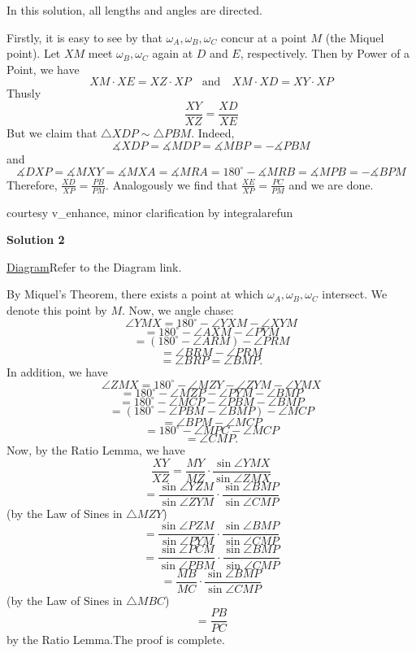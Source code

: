 \begin{enumerate}
 In this solution, all lengths and angles are directed.

 Firstly, it is easy to see by that $\omega_A, \omega_B, \omega_C$ concur at a point $M$ (the Miquel point). Let $XM$ meet $\omega_B, \omega_C$ again at $D$ and $E$, respectively. Then by Power of a Point, we have 
 \[XM \cdot XE = XZ \cdot XP \quad\text{and}\quad XM \cdot XD = XY \cdot XP\] Thusly 
 \[\frac{XY}{XZ} = \frac{XD}{XE}\] But we claim that $\triangle XDP \sim \triangle PBM$. Indeed, 
 \[\measuredangle XDP = \measuredangle MDP = \measuredangle MBP = - \measuredangle PBM\] and 
 \[\measuredangle DXP = \measuredangle MXY = \measuredangle MXA = \measuredangle MRA = 180^\circ - \measuredangle MRB = \measuredangle MPB = -\measuredangle BPM\]Therefore, $\frac{XD}{XP} = \frac{PB}{PM}$. Analogously we find that $\frac{XE}{XP} = \frac{PC}{PM}$ and we are done.

 
courtesy v\_enhance, minor clarification by integralarefun

 



\textbf{Solution 2}

\href{https://www.flickr.com/photos/127013945@N03/14800492500/lightbox/}{Diagram}Refer to the Diagram link.

 By Miquel's Theorem, there exists a point at which $\omega_A, \omega_B, \omega_C$ intersect. We denote this point by $M.$ Now, we angle chase:
 \[\angle YMX = 180^{\circ} - \angle YXM - \angle XYM\]
 \[= 180^{\circ} - \angle AXM - \angle PYM\]
 \[= \left(180^{\circ} - \angle ARM\right) - \angle PRM\]
 \[= \angle BRM - \angle PRM\]
 \[= \angle BRP = \angle BMP.\]In addition, we have
 \[\angle ZMX = 180^{\circ} - \angle MZY - \angle ZYM - \angle YMX\]
 \[= 180^{\circ} - \angle MZP - \angle PYM - \angle BMP\]
 \[= 180^{\circ} - \angle MCP - \angle PBM - \angle BMP\]
 \[= \left(180^{\circ} - \angle PBM - \angle BMP\right) - \angle MCP\]
 \[= \angle BPM - \angle MCP\]
 \[= 180^{\circ} - \angle MPC - \angle MCP\]
 \[= \angle CMP.\]Now, by the Ratio Lemma, we have
 \[\frac{XY}{XZ} = \frac{MY}{MZ} \cdot \frac{\sin \angle YMX}{\sin \angle ZMX}\]
 \[= \frac{\sin \angle YZM}{\sin \angle ZYM} \cdot \frac{\sin \angle BMP}{\sin \angle CMP}\] (by the Law of Sines in $\triangle MZY$)
 \[= \frac{\sin \angle PZM}{\sin \angle PYM} \cdot \frac{\sin \angle BMP}{\sin \angle CMP}\]
 \[= \frac{\sin \angle PCM}{\sin \angle PBM} \cdot \frac{\sin \angle BMP}{\sin \angle CMP}\]
 \[= \frac{MB}{MC} \cdot \frac{\sin \angle BMP}{\sin \angle CMP}\] (by the Law of Sines in $\triangle MBC$)
 \[= \frac{PB}{PC}\] by the Ratio Lemma.The proof is complete.


\end{enumerate}

